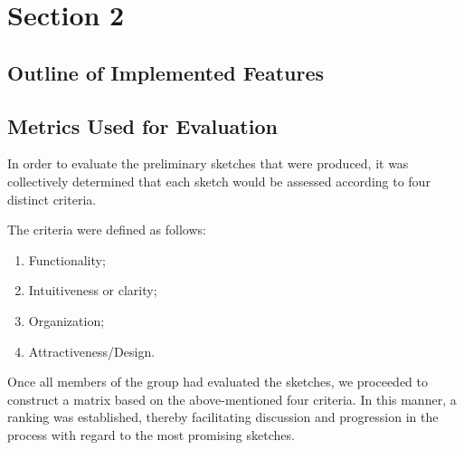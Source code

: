 \chapter{Section 2} \label{section2}
\section{Outline of Implemented Features}
\section{Metrics Used for Evaluation}
In order to evaluate the preliminary sketches that were produced, it was
collectively determined that each sketch would be assessed according to four
distinct criteria. \par 
The criteria were defined as follows:
\begin{enumerate}
    \item Functionality;
    \item Intuitiveness or clarity;
    \item Organization;
    \item Attractiveness/Design. 
\end{enumerate} \par 
Once all members of the group had evaluated the sketches, we proceeded to
construct a matrix based on the above-mentioned four criteria. In this manner, a
ranking was established, thereby facilitating discussion and progression in the
process with regard to the most promising sketches.
